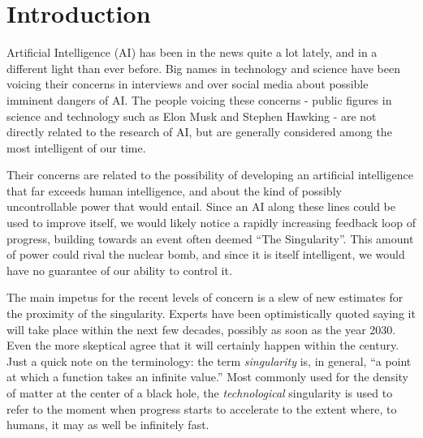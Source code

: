 \documentclass[12pt]{article} %
\begin{document}
\tableofcontents %

\newpage %


\section{Introduction} %

Artificial Intelligence (AI) has been in the news quite a lot lately, and in a different light than ever before. Big names in technology and science have been voicing their concerns in interviews and over social media about possible imminent dangers of AI. The people voicing these concerns - public figures in science and technology such as Elon Musk\cite{muskinterview} and Stephen Hawking\cite{hawkinginterview} - are not directly related to the research of AI, but are generally considered among the most intelligent of our time.

Their concerns are related to the possibility of developing an artificial intelligence that far exceeds human intelligence, and about the kind of possibly uncontrollable power that would entail. Since an AI along these lines could be used to improve itself, we would likely notice a rapidly increasing feedback loop of progress, building towards an event often deemed ``The Singularity''\cite{wbw}. This amount of power could rival the nuclear bomb, and since it is itself intelligent, we would have no guarantee of our ability to control it.

The main impetus for the recent levels of concern is a slew of new estimates for the proximity of the singularity. Experts have been optimistically quoted saying it will take place within the next few decades, possibly as soon as the year 2030\cite{wbw}. Even the more skeptical agree that it will certainly happen within the century\cite{wbw}. Just a quick note on the terminology: the term \textit{singularity} is, in general, ``a point at which a function takes an infinite value.'' Most commonly used for the density of matter at the center of a black hole, the \textit{technological} singularity is used to refer to the moment when progress starts to accelerate to the extent where, to humans, it may as well be infinitely fast.
\end{document}

